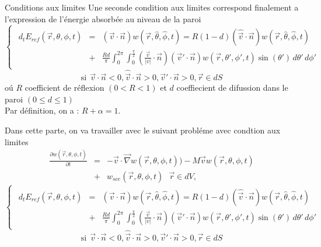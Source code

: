 \begin{frame}{Conditions aux limites} 
Une seconde condition aux limites correspond finalement a l'expression de l'énergie absorbée au niveau de la paroi
\begin{equation*}
\begin{cases}
\begin{split}
d_t E_{ref}(\vec{r},\theta,\phi,t) &=& (\vec{v}\cdot \vec{n}) w (\vec{r},\hat{\theta},\hat{\phi},t) 
 =R(1-d) (\hat{\vec{v}} \cdot \vec{n}) w (\vec{r},\hat{\theta},\hat{\phi},t) \\
&+&
\frac{R d}{\pi} \int_{0}^{2\pi}\int_{0}^{\frac{\pi}{2}} (\frac{ \vec{v}}{\left | v \right |} \cdot \vec{n}) (\vec{v}' \cdot \vec{n})  w(\vec{r},\theta',\phi',t) \sin(\theta') \, d\theta' \,d\phi'
\end{split}
\end{cases}
\end{equation*}
\begin{equation}
\mbox{si}  \ \   \vec{v} \cdot \vec{n} <0, \hat{\vec{v}} \cdot \vec{n} >0, \vec{v}' \cdot \vec{n} >0, \vec{r}\in dS 
\end{equation}
oú
$R $ coefficient de réflexion  $(0<R<1)$ et 
$d$ coeffiecient de difussion dans le paroi $( 0\leq d \leq 1)$ \\
Par définition, on a : $R+ \alpha=1$.
\end{frame}
\begin{frame}
Dans cette parte, on va travailler  avec le suivant probléme avec condtion aux limites
\begin{eqnarray*}
\frac{\partial w(\vec{r},\theta,\phi,t)}{\partial t}&=& -	\vec{v} \cdot\vec{\nabla}w(\vec{r},\theta,\phi,t))-M\vec{v} w(\vec{r},\theta,\phi,t) \\
&+&  w_{sce} (\vec{r},\theta,\phi,t) \ \ \  \vec{r}\in dV,
\end{eqnarray*}
\begin{equation*}
\begin{cases}
\begin{split}
d_t E_{ref}(\vec{r},\theta,\phi,t) &=& (\vec{v}\cdot \vec{n}) w (\vec{r},\hat{\theta},\hat{\phi},t) 
 =R(1-d) (\hat{\vec{v}} \cdot \vec{n}) w (\vec{r},\hat{\theta},\hat{\phi},t) \\
&+&
\frac{R d}{\pi} \int_{0}^{2\pi}\int_{0}^{\frac{\pi}{2}} (\frac{ \vec{v}}{\left | v \right |} \cdot \vec{n}) (\vec{v}' \cdot \vec{n})  w(\vec{r},\theta',\phi',t) \sin(\theta') \, d\theta' \,d\phi'
\end{split}
\end{cases}
\end{equation*}
\begin{equation}
\mbox{si}  \ \   \vec{v} \cdot \vec{n} <0, \hat{\vec{v}} \cdot \vec{n} >0, \vec{v}' \cdot \vec{n} >0, \vec{r}\in dS 
\end{equation}
\end{frame}
